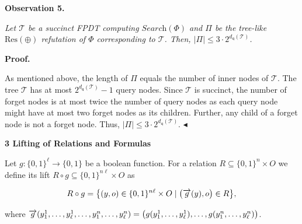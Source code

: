 \documentclass[10pt,a4paper]{article}
\begin{document}


\par\medskip\noindent\textbf{
\textbf{Observation 5}\textbf{.}
}\par



\emph{Let $\mathcal{T}$ be a succinct FPDT computing $\textit{Search}(\Phi)$ and $\Pi$ be the tree-like $\text{Res}(\oplus)$ refutation of $\Phi$ corresponding to $\mathcal{T}$. Then, $|\Pi|\leq 3\cdot 2^{d_{\mathsf{q}}(\mathcal{T})}$.}\par







\par\medskip\noindent\textbf{Proof.}\par




As mentioned above, the length of $\Pi$ equals the number of inner nodes of $\mathcal{T}$.
The tree $\mathcal{T}$ has at most $2^{d_{\mathsf{q}}(\mathcal{T})}-1$ query nodes.
Since $\mathcal{T}$ is succinct, the number of forget nodes is at most twice the number of query nodes as each query node might have at most two forget nodes as its children. Further, any child of a forget node is not a forget node.
Thus, $|\Pi|\leq 3\cdot 2^{d_{\mathsf{q}}(\mathcal{T})}$.
$\blacktriangleleft$\par






\par\medskip\noindent\textbf{
3 Lifting of Relations and Formulas}\par




Let $g:\{0,1\}^{\ell}\to\{0,1\}$ be a boolean function.
For a relation $R\subseteq\{0,1\}^{n}\times O$ we define its lift $R\circ g\subseteq\{0,1\}^{n\ell}\times O$ as\par


\[\begin{gathered}
R\circ g=\bigl{\{}(y,o)\in\{0,1\}^{n\ell}\times O\mid\bigl{(}\overrightarrow{g%
}(y),o\bigr{)}\in R\bigr{\}},
\end{gathered}\]


where $\overrightarrow{g}(y^{1}_{1},\dots,y^{1}_{\ell},\dots,y^{n}_{1},\dots,y^{n}_{%
\ell})=\bigl{(}g(y^{1}_{1},\dots,y^{1}_{\ell}),\dots,g(y^{n}_{1},\dots,y^{n}_{%
\ell})\bigr{)}$.\par
\end{document}
